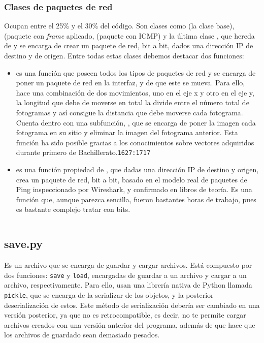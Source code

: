 \documentclass[a4paper, 11pt]{report} %
\begin{document}
\subsubsection{Clases de paquetes de red}
Ocupan entre el 25\% y el 30\% del código. Son clases como  (la clase base),  (paquete con \textit{frame} aplicado,  (paquete con ICMP) y la última clase , que hereda de  y se encarga de crear un paquete de red, bit a bit, dados una dirección IP de destino y de origen.
Entre todas estas clases debemos destacar dos funciones:
\begin{itemize}
\item {} es una función que poseen todos los tipos de paquetes de red y se encarga de poner un paquete de red en la interfaz, y de que este se mueva. Para ello, hace una combinación de dos movimientos, uno en el eje x y otro en el eje y, la longitud que debe de moverse en total la divide entre el número total de fotogramas y así consigue la distancia que debe moverse cada fotograma. Cuenta dentro con una subfunción, , que se encarga de poner la imagen cada fotograma en su sitio y eliminar la imagen del fotograma anterior. Esta función ha sido posible gracias a los conocimientos sobre vectores adquiridos durante primero de 
Bachillerato.\texttt{1627:1717}
\item {} es una función propiedad de , que dadas una dirección IP de destino y origen, crea un paquete de red, bit a bit, basado en el modelo real de paquetes de Ping inspeccionado por Wireshark, y confirmado en libros de teoría. Es una función que, aunque parezca sencilla, fueron bastantes horas de trabajo, pues es bastante complejo tratar con bits.
\end{itemize}
\inputminted[firstline=1782, lastline=1818, baselinestretch=1, fontsize=\scriptsize, linenos, breaklines]{python}{Codigo/Main.py}

\subsection{save.py}
Es un archivo que se encarga de guardar y cargar archivos. Está compuesto por dos funciones: \texttt{save} y \texttt{load}, encargadas de guardar a un archivo y cargar a un archivo, respectivamente. Para ello, usan una librería nativa de Python llamada \texttt{pickle}, que se encarga de la \gls{serializar} de los objetos, y la posterior deserialización de estos. Este método de serialización debería ser cambiado en una versión posterior, ya que no es retrocompatible, es decir, no te permite cargar archivos creados con una versión anterior del programa, además de que hace que los archivos de guardado sean demasiado pesados.
\end{document}
